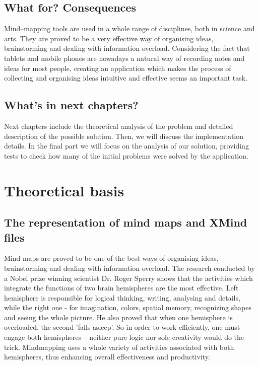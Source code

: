 \documentclass[american]{bsc}
\begin{document}
\section{What for? Consequences}
\label{sec:whatfor}
Mind--mapping tools are used in a whole range of disciplines, both in science and arts. They are proved to be a very effective way of organising ideas, brainstorming and dealing with information overload. Considering the fact that tablets and mobile phones are nowadays a natural way of recording notes and ideas for most people, creating an application which makes the process of collecting and organising ideas intuitive and effective seems an important task.

\section{What's in next chapters?}
\label{sec:nextchapters}
Next chapters include the theoretical analysis of the problem and detailed description of the possible solution. Then, we will discuss the implementation details. In the final part we will focus on the analysis of our solution, providing tests to check how many of the initial problems were solved by the application.

\chapter{Theoretical basis}
\label{chap:theory}

\section{The representation of mind maps and XMind files}
\label{sec:xmind}


Mind maps are proved to be one of the best ways of organising ideas, brainstorming and dealing with information overload. The research conducted by a Nobel prize winning scientist Dr. Roger Sperry shows that the activities which integrate the functions of two brain hemispheres are the most effective. Left hemisphere is responsible for logical thinking, writing, analysing and details, while the right one - for imagination, colors, spatial memory, recognizing shapes and seeing the whole picture. He also proved that when one hemisphere is overloaded, the second 'falls asleep'. So in order to work efficiently, one must engage both hemispheres -- neither pure logic nor sole creativity would do the trick. Mindmapping uses a whole variety of activities associated with both hemispheres, thus enhancing overall effectiveness and productivity. 
\end{document}
